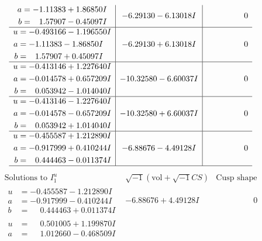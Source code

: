 \documentclass[1p]{elsarticle_modified}
\theoremstyle{definition}
\newcommand{\I}{\sqrt{-1}}
\begin{document}
$$\begin{array}{c|c|c}
\begin{aligned}
a &= -1.11383 + 1.86850 I \\
b &= \phantom{-}1.57907 - 0.45097 I\end{aligned}
 & -6.29130 - 6.13018 I & \phantom{-0.000000 } 0 \\ \hline\begin{aligned}
u &= -0.493166 - 1.196550 I \\
a &= -1.11383 - 1.86850 I \\
b &= \phantom{-}1.57907 + 0.45097 I\end{aligned}
 & -6.29130 + 6.13018 I & \phantom{-0.000000 } 0 \\ \hline\begin{aligned}
u &= -0.413146 + 1.227640 I \\
a &= -0.014578 + 0.657209 I \\
b &= \phantom{-}0.053942 - 1.014040 I\end{aligned}
 & -10.32580 - 6.60037 I & \phantom{-0.000000 } 0 \\ \hline\begin{aligned}
u &= -0.413146 - 1.227640 I \\
a &= -0.014578 - 0.657209 I \\
b &= \phantom{-}0.053942 + 1.014040 I\end{aligned}
 & -10.32580 + 6.60037 I & \phantom{-0.000000 } 0 \\ \hline\begin{aligned}
u &= -0.455587 + 1.212890 I \\
a &= -0.917999 + 0.410244 I \\
b &= \phantom{-}0.444463 - 0.011374 I\end{aligned}
 & -6.88676 - 4.49128 I & \phantom{-0.000000 } 0\\
 \hline 
 \end{array}$$\newpage$$\begin{array}{c|c|c}  
\text{Solutions to }I^u_{1}& \I (\text{vol} + \sqrt{-1}CS) & \text{Cusp shape}\\
 \hline 
\begin{aligned}
u &= -0.455587 - 1.212890 I \\
a &= -0.917999 - 0.410244 I \\
b &= \phantom{-}0.444463 + 0.011374 I\end{aligned}
 & -6.88676 + 4.49128 I & \phantom{-0.000000 } 0 \\ \hline\begin{aligned}
u &= \phantom{-}0.501005 + 1.199870 I \\
a &= \phantom{-}1.012660 - 0.468509 I \\

\end{aligned}
\end{array}$$
\end{document}
